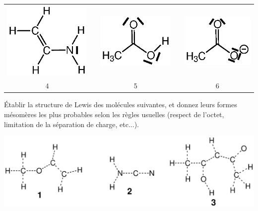 \begin{center}
\begin{tabular}{ccccc}
\includegraphics[scale=0.7]{figure/meso4.eps} &    &\includegraphics[scale=0.7]{figure/meso5.eps} &  &\includegraphics[scale=0.7]{figure/meso6.eps} \\
4& &5&  &6\\
\end{tabular}
\end{center}

\'Etablir la structure de Lewis des mol\'ecules suivantes, et donnez leurs formes m\'esom\`eres 
les plus probables selon les r\`egles usuelles (respect de l'octet, limitation de la s\'eparation de charge, etc...).

\begin{center}
\includegraphics[scale=0.77]{figure/lewis4.eps}
\end{center}


